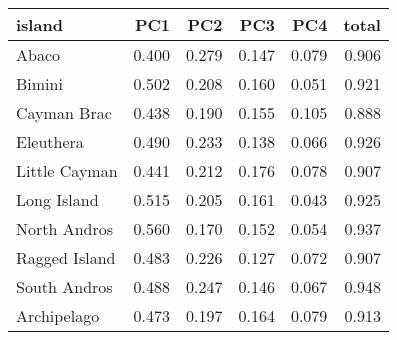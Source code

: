 
\begin{tabular}{lrrrrr}
\toprule
island & PC1 & PC2 & PC3 & PC4 & total\\
\midrule
Abaco & 0.400 & 0.279 & 0.147 & 0.079 & 0.906\\
Bimini & 0.502 & 0.208 & 0.160 & 0.051 & 0.921\\
Cayman Brac & 0.438 & 0.190 & 0.155 & 0.105 & 0.888\\
Eleuthera & 0.490 & 0.233 & 0.138 & 0.066 & 0.926\\
Little Cayman & 0.441 & 0.212 & 0.176 & 0.078 & 0.907\\
Long Island & 0.515 & 0.205 & 0.161 & 0.043 & 0.925\\
North Andros & 0.560 & 0.170 & 0.152 & 0.054 & 0.937\\
Ragged Island & 0.483 & 0.226 & 0.127 & 0.072 & 0.907\\
South Andros & 0.488 & 0.247 & 0.146 & 0.067 & 0.948\\
Archipelago & 0.473 & 0.197 & 0.164 & 0.079 & 0.913\\
\bottomrule
\end{tabular}
